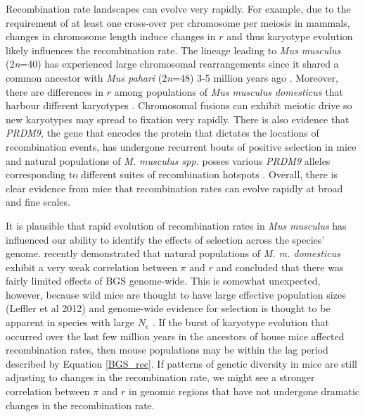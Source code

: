\documentclass[11pt,twoside, onecolumn]{GSA_format}
\begin{document}
Recombination rate landscapes can evolve very rapidly. For example, due to the requirement of at least one cross-over per chromosome per meiosis in mammals, changes in chromosome length induce changes in $r$ and thus karyotype evolution likely influences the recombination rate. The lineage leading to \textit{Mus musculus} (2\textit{n}=40) has experienced large chromosomal rearrangements since it shared a common ancestor with \textit{Mus pahari} (2\textit{n}=48) 3-5 million years ago \citep{Thybert2018}. Moreover, there are differences in $r$ among populations of \textit{Mus musculus domesticus} that harbour different karyotypes \citep{Vara2021}. Chromosomal fusions can exhibit meiotic drive \citep{Chmatal2014} so new karyotypes may spread to fixation very rapidly. There is also evidence that \textit{PRDM9}, the gene that encodes the protein that dictates the locations of recombination events, has undergone recurrent bouts of positive selection in mice \citep{RN329} and natural populations of \textit{M. musculus spp.} posses various \textit{PRDM9} alleles corresponding to different suites of recombination hotspots \citep{RN249}. Overall, there is clear evidence from mice that recombination rates can evolve rapidly at broad and fine scales. 

\vspace{5px}

It is plausible that rapid evolution of recombination rates in \textit{Mus musculus} has influenced our ability to identify the effects of selection across the species' genome. \cite{Kartje2020} recently demonstrated that natural populations of \textit{M. m. domesticus} exhibit a very weak correlation between $\pi$ and $r$ and concluded that there was fairly limited effects of BGS genome-wide. This is somewhat unexpected, however, because wild mice are thought to have large effective population sizes (Leffler et al 2012) and genome-wide evidence for selection is thought to be apparent in species with large $N_e$ \citep{RN117}. If the burst of karyotype evolution that occurred over the last few million years in the ancestors of house mice affected recombination rates, then mouse populations may be within the lag period described by Equation \ref{BGS_rec}. If patterns of genetic diversity in mice are still adjusting to changes in the recombination rate, we might see a stronger correlation between $\pi$ and $r$ in genomic regions that have not undergone dramatic changes in the recombination rate. 

\vspace{5px}
\end{document}
